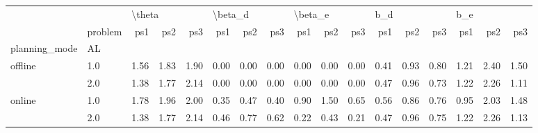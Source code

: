 \begin{tabular}{llrrrrrrrrrrrrrrr}
\toprule
       & {} & \multicolumn{3}{l}{\textbackslash theta} & \multicolumn{3}{l}{\textbackslash beta\_d} & \multicolumn{3}{l}{\textbackslash beta\_e} & \multicolumn{3}{l}{b\_d} & \multicolumn{3}{l}{b\_e} \\
       & problem &    ps1 &  ps2 &  ps3 &     ps1 &  ps2 &  ps3 &     ps1 &  ps2 &  ps3 &  ps1 &  ps2 &  ps3 &  ps1 &  ps2 &  ps3 \\
planning\_mode & AL &        &      &      &         &      &      &         &      &      &      &      &      &      &      &      \\
\midrule
offline & 1.0 &   1.56 & 1.83 & 1.90 &    0.00 & 0.00 & 0.00 &    0.00 & 0.00 & 0.00 & 0.41 & 0.93 & 0.80 & 1.21 & 2.40 & 1.50 \\
       & 2.0 &   1.38 & 1.77 & 2.14 &    0.00 & 0.00 & 0.00 &    0.00 & 0.00 & 0.00 & 0.47 & 0.96 & 0.73 & 1.22 & 2.26 & 1.11 \\
online & 1.0 &   1.78 & 1.96 & 2.00 &    0.35 & 0.47 & 0.40 &    0.90 & 1.50 & 0.65 & 0.56 & 0.86 & 0.76 & 0.95 & 2.03 & 1.48 \\
       & 2.0 &   1.38 & 1.77 & 2.14 &    0.46 & 0.77 & 0.62 &    0.22 & 0.43 & 0.21 & 0.47 & 0.96 & 0.75 & 1.22 & 2.26 & 1.13 \\
\bottomrule
\end{tabular}
